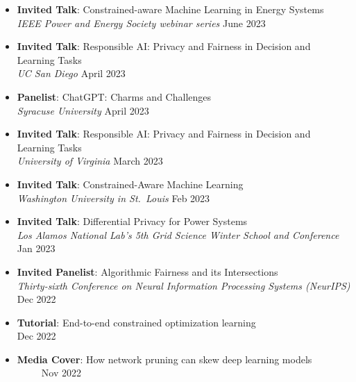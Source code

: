 \begin{itemize}
  \item {\bf Invited Talk}: {Constrained-aware Machine Learning in Energy Systems}\\
  {\em  IEEE Power and Energy Society webinar series}
  \hfill{June 2023}

  \item {\bf Invited Talk}: {Responsible AI: Privacy and Fairness in Decision and Learning Tasks}\\
  {\em  UC San Diego}
  \hfill{April 2023}

  \item {\bf Panelist}: {ChatGPT: Charms and Challenges}\\
  {\em  Syracuse University}
  \hfill{April 2023}

  \item {\bf Invited Talk}: {Responsible AI: Privacy and Fairness in Decision and Learning Tasks}\\
  {\em  University of Virginia}
  \hfill{March 2023}

  \item {\bf Invited Talk}: {Constrained-Aware Machine Learning}\\
  {\em  Washington University in St.~Louis}
  \hfill{Feb 2023}

  \item {\bf Invited Talk}: {Differential Privacy for Power Systems}\\
  {\em  Los Alamos National Lab's 5th Grid Science Winter School and Conference}
  \hfill{Jan 2023}

  \item {\bf Invited Panelist}: {Algorithmic Fairness and its Intersections}\\
  {\em Thirty-sixth Conference on Neural Information Processing Systems (NeurIPS)}
  \hfill{Dec 2022}

  \item {\bf Tutorial}: {End-to-end constrained optimization learning}\\
  \hfill{Dec 2022}

  \item {\bf Media Cover}: 
  {How network pruning can skew deep learning models}\\ 
  ~
  ~
  ~
  \hfill {Nov 2022}


\end{itemize}

